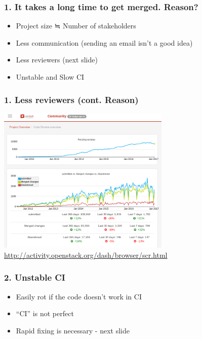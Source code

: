 \documentclass[aspectratio=169,11pt,hyperref={colorlinks=true}]{beamer}
\begin{document}
\begin{frame}
  \frametitle{1. It takes a long time to get merged. Reason?}
  \begin{itemize}
    \item Project size ≒ Number of stakeholders
    \item Less communication (sending an email isn't a good idea)
    \item Less reviewers (next slide)
    \item Unstable and Slow CI
  \end{itemize}
\end{frame}

\begin{frame}
  \frametitle{1. Less reviewers (cont. Reason)}
  \centering\includegraphics[height=70mm]{images/project-overview.png}
  \url{http://activity.openstack.org/dash/browser/scr.html}
\end{frame}

\begin{frame}
  \frametitle{2. Unstable CI}
  \begin{itemize}
    \item Easily rot if the code doesn't work in CI
    \item ``CI'' is not perfect
    \item Rapid fixing is necessary - next slide
  \end{itemize}
\end{frame}
\end{document}
